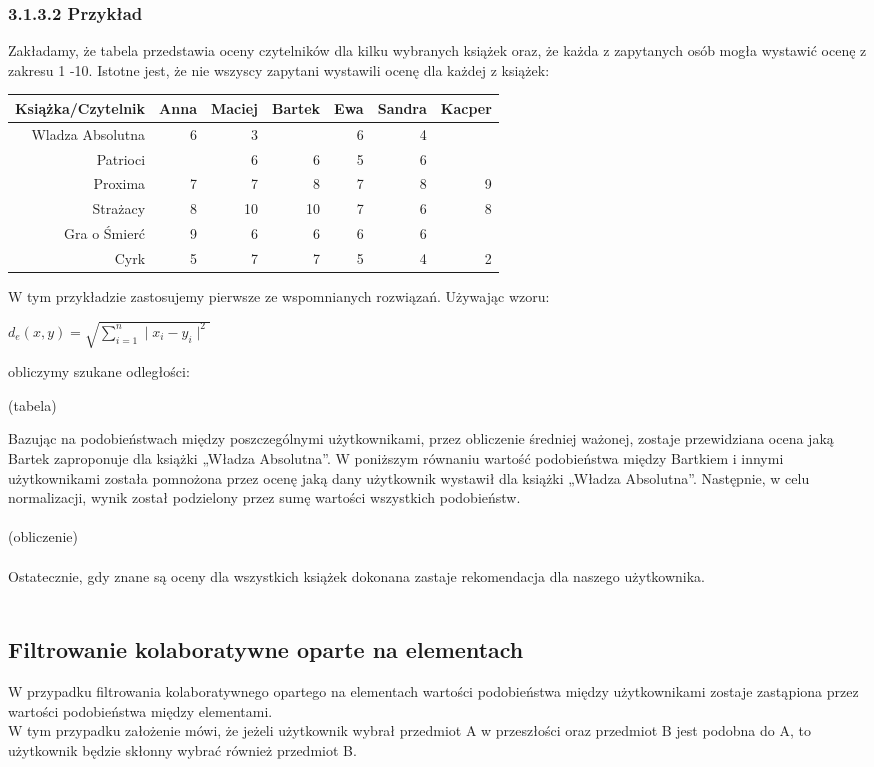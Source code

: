 \documentclass[12pt,a4paper]{report}
\begin{document}
\subsubsection{3.1.3.2 Przykład}
Zakładamy, że tabela przedstawia oceny czytelników dla kilku wybranych książek oraz, że każda z zapytanych osób mogła wystawić ocenę z zakresu 1 -10. Istotne jest, że nie wszyscy zapytani wystawili ocenę dla każdej z książek:
\begin{center}
\begin{tabular}{|r|r|r|r|r|r|r|} \hline
Książka/Czytelnik & Anna & Maciej & Bartek & Ewa & Sandra & Kacper \\
\hline \hline 
Wladza Absolutna & 6 & 3 & & 6 & 4 &  \\
Patrioci &  & 6 & 6 & 5 & 6 &  \\
Proxima & 7 & 7 & 8 & 7 & 8 & 9 \\
Strażacy & 8 & 10 & 10 & 7 & 6 & 8 \\
Gra o Śmierć & 9 & 6 & 6 & 6 & 6 &  \\
Cyrk & 5 & 7 & 7 & 5 & 4 & 2 \\
\hline
\end{tabular}
\end{center}
W tym przykładzie zastosujemy pierwsze ze wspomnianych rozwiązań. Używając wzoru:
\begin{center}
$d_{e}(x,y) = \sqrt{\sum_{i=1}^n \mid x_{i} - y_{i} \mid ^2 }$
\end{center}
obliczymy szukane odległości:

(tabela)

Bazując na podobieństwach między poszczególnymi użytkownikami, przez obliczenie średniej ważonej, zostaje przewidziana ocena jaką Bartek zaproponuje dla książki „Władza Absolutna”. W poniższym równaniu wartość podobieństwa między Bartkiem i innymi użytkownikami została pomnożona przez ocenę jaką dany użytkownik wystawił dla książki „Władza Absolutna”. Następnie, w celu normalizacji, wynik został podzielony przez sumę wartości wszystkich podobieństw.
\\
\\(obliczenie)
\\
\\Ostatecznie, gdy znane są oceny dla wszystkich książek dokonana zastaje rekomendacja dla naszego użytkownika.
\\
\\
\subsection{Filtrowanie kolaboratywne oparte na  elementach}
W przypadku filtrowania kolaboratywnego opartego na elementach wartości podobieństwa między użytkownikami zostaje zastąpiona przez  wartości podobieństwa między elementami.
\\W tym przypadku założenie mówi, że jeżeli użytkownik wybrał przedmiot A w przeszłości oraz przedmiot B jest podobna do A, to użytkownik będzie skłonny wybrać również przedmiot B.
\end{document}
